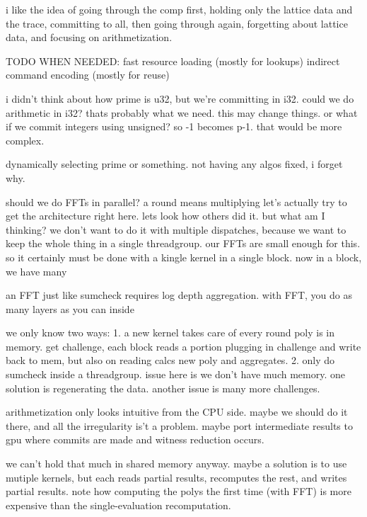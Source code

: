 i like the idea of going through the comp first, holding only the lattice data and the trace, committing to all, then going through again, forgetting about lattice data, and focusing on arithmetization. 




TODO WHEN NEEDED:
fast resource loading (mostly for lookups)
indirect command encoding (mostly for reuse)



i didn't think about how prime is u32, but we're committing in i32.
could we do arithmetic in i32? thats probably what we need. this may change things.
or what if we commit integers using unsigned? so -1 becomes p-1. that would be more complex.

dynamically selecting prime or something. not having any algos fixed, i forget why.


should we do FFTs in parallel?
a round means multiplying
let's actually try to get the architecture right here. 
lets look how others did it. 
but what am I thinking?
we don't want to do it with multiple dispatches, because we want to keep the whole thing in a single threadgroup. our FFTs are small enough for this.
so it certainly must be done with a kingle kernel in a single block.
now in a block, we have many 

an FFT just like sumcheck requires log depth aggregation.
with FFT, you do as many layers as you can inside 



we only know two ways:
1. a new kernel takes care of every round
    poly is in memory. get challenge, each block reads a portion plugging in challenge and write back to mem, but also on reading calcs new poly and aggregates.
2. only do sumcheck inside a threadgroup. issue here is we don't have much memory. one solution is regenerating the data. another issue is many more challenges. 

arithmetization only looks intuitive from the CPU side. maybe we should do it there, and all the irregularity is't a problem. maybe port intermediate results to gpu where commits are made and witness reduction occurs. 


we can't hold that much in shared memory anyway. maybe a solution is to use mutiple kernels, but each reads partial results, recomputes the rest, and writes partial results. 
note how computing the polys the first time (with FFT) is more expensive than the single-evaluation recomputation.



